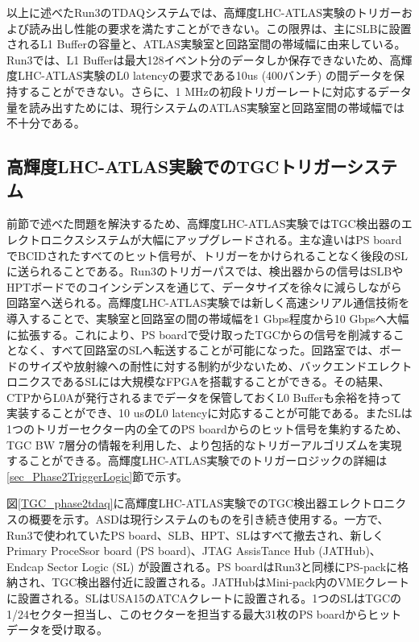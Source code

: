 以上に述べたRun3のTDAQシステムでは、高輝度LHC-ATLAS実験のトリガーおよび読み出し性能の要求を満たすことができない。この限界は、主にSLBに設置されるL1 Bufferの容量と、ATLAS実験室と回路室間の帯域幅に由来している。Run3では、L1 Bufferは最大128イベント分のデータしか保存できないため、高輝度LHC-ATLAS実験のL0 latencyの要求である10us  (400バンチ) の間データを保持することができない。さらに、1 MHzの初段トリガーレートに対応するデータ量を読み出すためには、現行システムのATLAS実験室と回路室間の帯域幅では不十分である。

    \subsection{高輝度LHC-ATLAS実験でのTGCトリガーシステム}  
前節で述べた問題を解決するため、高輝度LHC-ATLAS実験ではTGC検出器のエレクトロニクスシステムが大幅にアップグレードされる。主な違いはPS boardでBCIDされたすべてのヒット信号が、トリガーをかけられることなく後段のSLに送られることである。Run3のトリガーパスでは、検出器からの信号はSLBやHPTボードでのコインシデンスを通じて、データサイズを徐々に減らしながら回路室へ送られる。高輝度LHC-ATLAS実験では新しく高速シリアル通信技術を導入することで、実験室と回路室の間の帯域幅を1 Gbps程度から10 Gbpsへ大幅に拡張する。これにより、PS boardで受け取ったTGCからの信号を削減することなく、すべて回路室のSLへ転送することが可能になった。回路室では、ボードのサイズや放射線への耐性に対する制約が少ないため、バックエンドエレクトロニクスであるSLには大規模なFPGAを搭載することができる。その結果、CTPからL0Aが発行されるまでデータを保管しておくL0 Bufferも余裕を持って実装することができ、10 usのL0 latencyに対応することが可能である。またSLは1つのトリガーセクター内の全てのPS boardからのヒット信号を集約するため、TGC BW 7層分の情報を利用した、より包括的なトリガーアルゴリズムを実現することができる。高輝度LHC-ATLAS実験でのトリガーロジックの詳細は\ref{sec_Phase2TriggerLogic}節で示す。

図\ref{TGC_phase2tdaq}に高輝度LHC-ATLAS実験でのTGC検出器エレクトロニクスの概要を示す。ASDは現行システムのものを引き続き使用する。一方で、Run3で使われていたPS board、SLB、HPT、SLはすべて撤去され、新しくPrimary ProceSsor board  (PS board)、JTAG AssisTance Hub  (JATHub)、Endcap Sector Logic  (SL) が設置される。PS boardはRun3と同様にPS-packに格納され、TGC検出器付近に設置される。JATHubはMini-pack内のVMEクレートに設置される。SLはUSA15のATCAクレートに設置される。1つのSLはTGCの1/24セクター担当し、このセクターを担当する最大31枚のPS boardからヒットデータを受け取る。

